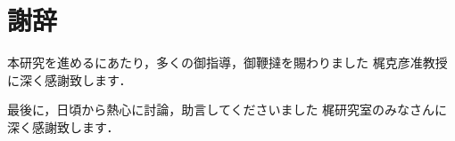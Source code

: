 \chapter*{謝辞}

本研究を進めるにあたり，多くの御指導，御鞭撻を賜わりました
梶克彦准教授に深く感謝致します．

最後に，日頃から熱心に討論，助言してくださいました
梶研究室のみなさんに深く感謝致します．

